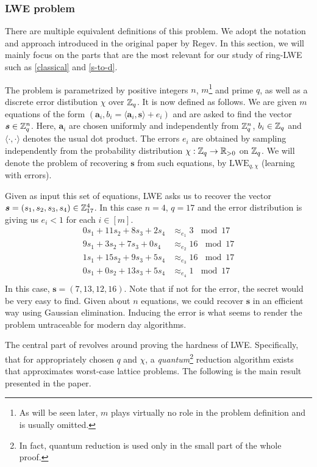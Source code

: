 \subsubsection*{LWE problem}
There are multiple equivalent definitions of this problem. We adopt the notation and approach introduced in the original paper by Regev. In this section, we will mainly focus on the parts that are the most relevant for our study of ring-LWE such as \ref{classical} and \ref{s-to-d}. 

The problem is parametrized by positive integers $n$, $m$\footnote{As will be seen later, $m$ plays virtually no role in the problem definition and is usually omitted.} and prime $q$, as well as a discrete error distibution $\chi$ over $\mathbb{Z}_q$. It is now defined as follows. We are given $m$ equations of the form $(\bm{a}_i, b_i = \langle \bm{a}_i, \bm{s} \rangle + e_i)$ and are asked to find the vector $\boldsymbol{s} \in \mathbb{Z}_q^n$. Here, $\bm{a}_i$ are chosen uniformly and independently from $\mathbb{Z}_q^n$, $b_i \in \mathbb{Z}_q$ and $\langle \cdot, \cdot \rangle$ denotes the usual dot product. The errors $e_i$ are obtained by sampling independently from the probability distribution $\chi : \mathbb{Z}_q \rightarrow \mathbb{R}_{> 0}$ on $\mathbb{Z}_q$. We will denote the problem of recovering $\bm{s}$ from such equations, by $\text{LWE}_{q, \chi}$ (learning with errors).

\begin{example}\label{lwe_ex}
	Given as input this set of equations, LWE asks us to recover the vector $\boldsymbol{s} = (s_1, s_2, s_3, s_4) \in \mathbb{Z}_{17}^4$. In this case $n = 4$, $q=17$ and the error distribution is giving us $e_i < 1$ for each $i \in [m]$. 
\begin{align*}
	0s_1 + 11s_2 +8s_3 + 2s_4 & \approx_{e_1} 3 \, \mod 17\\
	9s_1 +  3s_2 + 7s_3 + 0s_4 & \approx_{e_2} 16 \, \mod 17\\
	1s_1 +  15s_2 + 9s_3 + 5s_4 & \approx_{e_3} 16 \, \mod 17\\
	0s_1 +  0s_2 + 13s_3 + 5s_4 & \approx_{e_4} 1 \, \mod 17\\
\end{align*}
In this case, $\bm{s} = (7, 13, 12, 16)$. Note that if not for the error, the secret would be very easy to find. Given about $n$ equations, we could recover $\bm{s}$ in an efficient way using Gaussian elimination. Inducing the error is what seems to render the problem untraceable for modern day algorithms.
\end{example}
The central part of \cite{regev} revolves around proving the hardness of LWE. Specifically, that for appropriately chosen $q$ and $\chi$, a \textit{quantum}\footnote{In fact, quantum reduction is used only in the small part of the whole proof.} reduction algorithm exists that approximates worst-case lattice problems. The following is the main result presented in the paper. 

